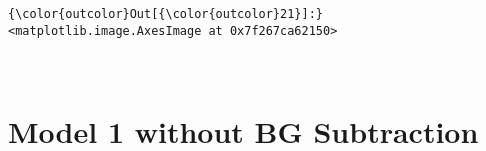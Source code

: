 \documentclass[11pt]{article}
\begin{document}
\begin{Verbatim}[commandchars=\\\{\}]
{\color{outcolor}Out[{\color{outcolor}21}]:} <matplotlib.image.AxesImage at 0x7f267ca62150>
\end{Verbatim}
            
    \begin{center}
    \end{center}
    { \hspace*{\fill} \\}
    
    \hypertarget{model-1-without-bg-subtraction}{%
\section{Model 1 without BG
Subtraction}\label{model-1-without-bg-subtraction}}
\end{document}
